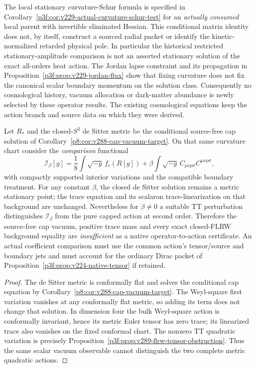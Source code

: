 \documentclass[12pt,a4paper]{article}
\begin{document}
The local stationary curvature-Schur formula is specified in
Corollary~\ref{p3f:cor:v229-actual-curvature-schur-test} for an
\emph{actually consumed} local parent with invertible eliminated Hessian.
This conditional matrix identity does not, by itself, construct a sourced
radial packet or identify the kinetic-normalized retarded physical pole.
In particular the historical restricted stationary-amplitude comparison is
not an asserted stationary solution of the exact all-orders heat action. The Jordan lapse constraint and its propagation in
Proposition~\ref{p3f:prop:v229-jordan-flux} show that fixing curvature
does not fix the canonical scalar boundary momentum on the solution
class. Consequently no cosmological history, vacuum allocation or
dark-matter abundance is newly selected by these operator results.
The existing cosmological equations keep the action branch and source
data on which they were derived.



\begin{corollary}
\label{p8:cor:v289-cap-tensor-discriminant}
Let $R_*$ and the closed-$S^3$ de Sitter metric be the conditional
source-free cap solution of
Corollary~\ref{p8:cor:v288-cap-vacuum-target}.
On that same curvature chart consider the \emph{comparison} functional
\[
 \mathcal I_\beta[g]=\frac18\int\sqrt{-g}\,f_c(R[g])
    +\beta\int\sqrt{-g}\,C_{\mu\nu\rho\sigma}C^{\mu\nu\rho\sigma},
\]
with compactly supported interior variations and the compatible
boundary treatment. For any constant $\beta$, the closed de Sitter
solution remains a metric stationary point; the trace equation and
its scalaron trace-linearization on that background are unchanged.
Nevertheless for $\beta\ne0$ a suitable TT perturbation distinguishes
$\mathcal I_\beta$ from the pure capped action at second order.
Therefore the source-free cap vacuum, positive trace mass and every
exact closed-FLRW background equality are \emph{insufficient} as a
native operator-to-action certificate. An actual coefficient comparison
must use the common action's tensor/source and boundary jets and must
account for the ordinary Dirac packet of
Proposition~\ref{p3f:prop:v224-native-tensor} if retained.
\end{corollary}
\begin{proof}
The de Sitter metric is conformally flat and solves the conditional
cap equation by Corollary~\ref{p8:cor:v288-cap-vacuum-target}. The Weyl-square first variation
vanishes at any conformally flat metric, so adding its term does not
change that solution. In dimension four the bulk Weyl-square action
is conformally invariant, hence its metric Euler tensor has zero trace;
its linearized trace also vanishes on the fixed conformal chart.
The nonzero TT quadratic variation is precisely
Proposition~\ref{p3f:prop:v289-flrw-tensor-obstruction}.
Thus the same scalar vacuum observable cannot distinguish the two
complete metric quadratic actions.
\end{proof}
\end{document}
